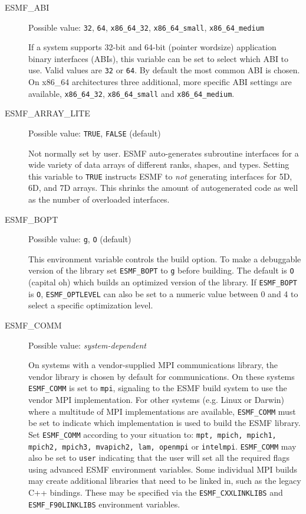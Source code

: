 \begin{description}

\item[ESMF\_ABI]
Possible value: {\tt 32}, {\tt 64}, {\tt x86\_64\_32}, {\tt x86\_64\_small}, {\tt x86\_64\_medium}

If a system supports 32-bit and 64-bit (pointer wordsize) application binary
interfaces (ABIs), this variable can be set to select which ABI to use. Valid
values are {\tt 32} or {\tt 64}. By default the most common ABI is chosen. On
x86\_64 architectures three additional, more specific ABI settings are available,
{\tt x86\_64\_32}, {\tt x86\_64\_small} and {\tt x86\_64\_medium}.

\item[ESMF\_ARRAY\_LITE]
Possible value: {\tt TRUE}, {\tt FALSE} (default)

Not normally set by user. ESMF auto-generates subroutine interfaces for a wide
variety of data arrays of different ranks, shapes, and types. Setting this
variable to {\tt TRUE} instructs ESMF to {\em not} generating interfaces for
5D, 6D, and 7D arrays. This shrinks the amount of autogenerated code as well
as the number of overloaded interfaces.

\item[ESMF\_BOPT]
Possible value: {\tt g}, {\tt O} (default)

This environment variable controls the build option. To make a debuggable
version of the library set {\tt ESMF\_BOPT} to {\tt g} before building. The
default is {\tt O} (capital oh) which builds an optimized version of the
library. If {\tt ESMF\_BOPT} is {\tt O}, {\tt ESMF\_OPTLEVEL} can also be set
to a numeric value between 0 and 4 to select a specific optimization level.

\item[ESMF\_COMM]
Possible value: {\em system-dependent}

On systems with a vendor-supplied MPI communications library, the vendor library
is chosen by default for communications. On these systems {\tt ESMF\_COMM} is
set to {\tt mpi}, signaling to the ESMF build system to use the vendor MPI
implementation.
For other systems (e.g. Linux or Darwin) where a multitude of MPI
implementations are available, {\tt ESMF\_COMM} must be set to indicate which
implementation is used to build the ESMF library. Set {\tt ESMF\_COMM} according
to your situation to: {\tt mpt, mpich, mpich1, mpich2, mpich3, mvapich2, lam, openmpi}
or {\tt intelmpi}. {\tt ESMF\_COMM} may also be set to {\tt user} indicating
that the user will set all the required flags using advanced ESMF environment
variables.  Some individual MPI builds may create additional libraries that
need to be linked in, such as the legacy C++ bindings. These may be specified
via the {\tt ESMF\_CXXLINKLIBS} and {\tt ESMF\_F90LINKLIBS} environment
variables.


\end{description}
